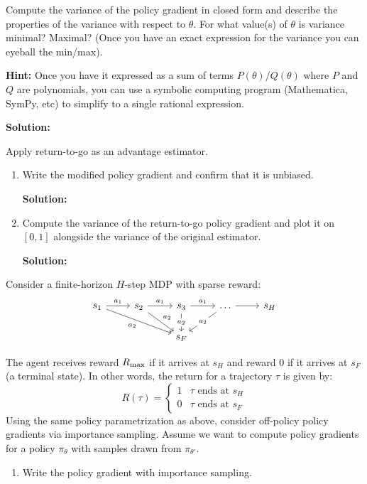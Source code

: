 \documentclass{article}
\begin{document}
\begin{enumerate}
\begin{enumerate}
\end{enumerate}
\newpage
{} Compute the variance of the policy gradient in closed form and describe the properties of the variance with respect to $\theta$. For what value(s) of $\theta$ is variance minimal? Maximal? (Once you have an exact expression for the variance you can eyeball the min/max).

\textbf{Hint:}  Once you have it expressed as a sum of terms $P(\theta)/Q(\theta)$ where $P$ and $Q$ are polynomials, you can use a symbolic computing program (Mathematica, SymPy, etc) to simplify to a single rational expression.

\textbf{Solution:}

\newpage
{} Apply return-to-go as an advantage estimator.
\begin{enumerate}
    \item Write the modified policy gradient and confirm that it is unbiased.

\textbf{Solution:}

    \item Compute the variance of the return-to-go policy gradient and plot it on $[0, 1]$ alongside the variance of the original estimator.

\textbf{Solution:}

\end{enumerate}
\newpage
{} Consider a finite-horizon $H$-step MDP with sparse reward:
\[\begin{tikzcd}
	{s_1} & {s_2} & {s_3} & \dots & {s_H} \\
	&& {s_F}
	\arrow["{a_1}", from=1-1, to=1-2]
	\arrow["{a_1}", from=1-2, to=1-3]
	\arrow["{a_2}"', from=1-1, to=2-3]
	\arrow["{a_1}", from=1-3, to=1-4]
	\arrow[from=1-4, to=1-5]
	\arrow["{a_2}", from=1-2, to=2-3]
	\arrow["{a_2}"{description}, from=1-3, to=2-3]
	\arrow["{a_2}"{description}, from=1-4, to=2-3]
\end{tikzcd}\]

The agent receives reward $R_{\textrm{max}}$ if it arrives at $s_H$ and reward $0$ if it arrives at $s_F$ (a terminal state). In other words, the return for a trajectory $\tau$ is given by:
\[R(\tau) = \begin{cases}1 & \tau \textrm{ ends at } s_H \\ 0 & \tau \textrm{ ends at } s_F \end{cases}\]
Using the same policy parametrization as above, consider off-policy policy gradients via importance sampling. Assume we want to compute policy gradients for a policy $\pi_\theta$ with samples drawn from $\pi_{\theta'}$.
\begin{enumerate}
    \item Write the policy gradient with importance sampling.


\end{enumerate}
\end{enumerate}
\end{document}
